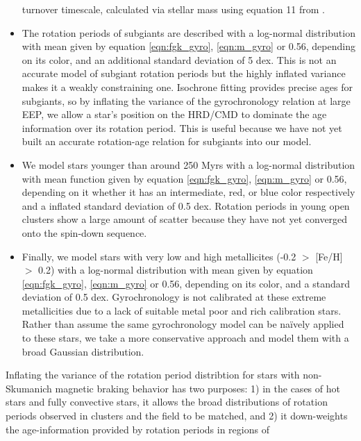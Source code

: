 \documentclass[useAMS, usenatbib, preprint, 12pt]{aastex}
\newcommand{\eg}{{\it e.g.}}
\begin{document}
\begin{itemize}
{        turnover timescale, calculated via stellar mass using equation 11 from
        \citet{wright2011}.}
    \item{The rotation periods of subgiants are described with a log-normal
        distribution with mean given by equation \ref{eqn:fgk_gyro},
        \ref{eqn:m_gyro} or 0.56, depending on its color, and an additional
        standard deviation of 5 dex.
        This is not an accurate model of subgiant rotation
        periods \citep[see, \eg][]{vansaders2013} but the highly
        inflated variance makes it a weakly constraining one.
        Isochrone fitting provides precise ages for subgiants, so by inflating
        the variance of the gyrochronology relation at large EEP, we allow a
        star's position on the HRD/CMD to dominate the age information over
        its rotation period.
        This is useful because we have not yet built an accurate rotation-age
        relation for subgiants into our model.}
    \item{We model stars younger than around 250 Myrs with a log-normal
        distribution with mean function given by equation \ref{eqn:fgk_gyro},
        \ref{eqn:m_gyro} or 0.56, depending on it whether it has
        an intermediate, red, or blue color respectively and a inflated
        standard deviation of 0.5 dex.
        Rotation periods in young open clusters show a large amount of scatter
        because they have not yet converged onto the \citet{skumanich1972}
        spin-down sequence.}
    \item{Finally, we model stars with very low and high metallicites (-0.2
        $>$ [Fe/H] $>$ 0.2) with a log-normal distribution with mean given by
        equation \ref{eqn:fgk_gyro}, \ref{eqn:m_gyro} or 0.56, depending on
        its color, and a standard deviation of 0.5 dex.
        Gyrochronology is not calibrated at these extreme metallicities due to
        a lack of suitable metal poor and rich calibration stars.
        Rather than assume the same gyrochronology model can be na\"ively
        applied to these stars, we take a more conservative approach and model
        them with a broad Gaussian distribution.}
\end{itemize}
Inflating the variance of the rotation period distribtion for stars with
non-Skumanich magnetic braking behavior has two purposes: 1) in the cases of
hot stars and fully convective stars, it allows the broad distributions of
rotation periods observed in clusters and the field to be matched, and 2) it
down-weights the age-information provided by rotation periods in regions of
\end{document}
